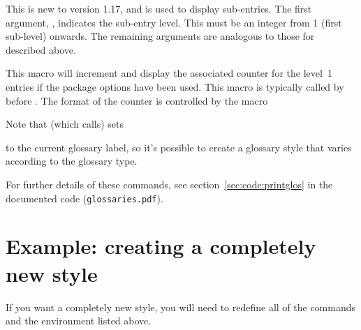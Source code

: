 \documentclass[report]{nlctdoc}
\begin{document}
\begin{definition}[\DescribeMacro{\glossarysubentryfield}]
\end{definition}
This is new to version 1.17, and is used to display sub-entries.
The first argument, , indicates the sub-entry level.
This must be an integer from 1 (first sub-level) onwards. The
remaining arguments are analogous to those for
 described above.

\begin{definition}[\DescribeMacro{\glssubentryitem}]
\end{definition}
This macro will increment and display the associated counter for the
level~1 entries if the  package options have
been used. This macro is typically called by 
before . The format of the counter is controlled by
the macro
\begin{definition}[\DescribeMacro{\glssubentrycounterlabel}]
\end{definition}

Note that  (which  calls)
sets
\begin{definition}[\DescribeMacro{\currentglossary}]
\end{definition}
to the current glossary label, so it's possible to create a glossary
style that varies according to the glossary type.

For further details of these commands, see \ifpdf
section~\ref*{sec:code:printglos} \fi {}
in the documented code (\texttt{glossaries.pdf}).

\section{Example: creating a completely new style}
\label{sec:exnewstyle}

If you want a completely new style, you will need to redefine all
of the commands and the environment listed above. 
\end{document}
